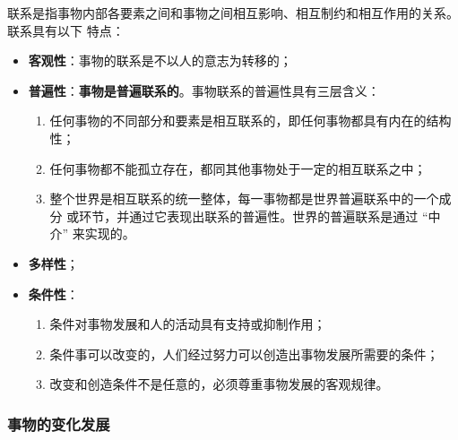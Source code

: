 \documentclass[utf-8, 10pt]{article}
\begin{document}
联系是指事物内部各要素之间和事物之间相互影响、相互制约和相互作用的关系。联系具有以下
特点：
\begin{itemize}[itemsep=0pt]
    \item \textbf{客观性}：事物的联系是不以人的意志为转移的；
    \item \textbf{普遍性}：\textbf{事物是普遍联系的}。事物联系的普遍性具有三层含义：
    \begin{enumerate}[label={${\arabic*}^\circ$}, itemsep=0pt]
        \item 任何事物的不同部分和要素是相互联系的，即任何事物都具有内在的结构性；
        \item 任何事物都不能孤立存在，都同其他事物处于一定的相互联系之中；
        \item 整个世界是相互联系的统一整体，每一事物都是世界普遍联系中的一个成分
        或环节，并通过它表现出联系的普遍性。世界的普遍联系是通过 “中介” 来实现的。
    \end{enumerate}
    \item \textbf{多样性}；
    \item \textbf{条件性}：
    \begin{enumerate}[label={${\arabic*}^\circ$}, itemsep=0pt]
        \item 条件对事物发展和人的活动具有支持或抑制作用；
        \item 条件事可以改变的，人们经过努力可以创造出事物发展所需要的条件；
        \item 改变和创造条件不是任意的，必须尊重事物发展的客观规律。
    \end{enumerate}
\end{itemize}



\subsubsection{事物的变化发展}
\end{document}
